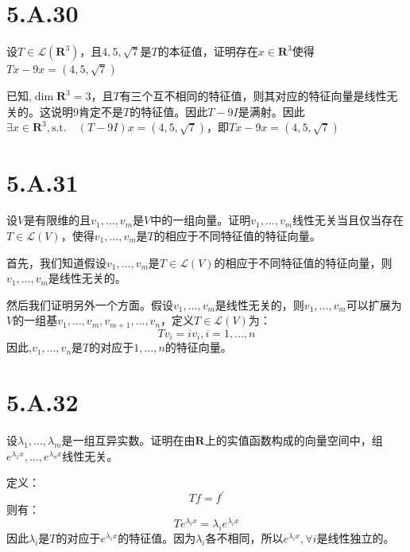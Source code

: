 \documentclass[10pt,a4paper,UTF8]{article}
\begin{document}
\section{5.A.30}
\label{sec:org901b0ee}


\begin{problem}
设\(T\in \mathcal{L}(\mathbf{R}^{3})\)，且\(4,5,\sqrt{7}\)是\(T\)的本征值，证明存在\(x\in \mathbf{R}^{3}\)使得\(Tx - 9x = (4,5,\sqrt{7})\)
\end{problem}

\begin{answer}
已知,\(\dim \mathbf{R}^{3} = 3\)，且\(T\)有三个互不相同的特征值，则其对应的特征向量是线性无关的。这说明\(9\)肯定不是\(T\)的特征值。因此\(T-9I\)是满射。因此\(\exists x\in \mathbf{R}^{3}, \mathrm{s.t.}\quad (T-9I)x = (4,5,\sqrt{7})\)，即\(Tx - 9x = (4,5,\sqrt{7})\)
\end{answer}
\section{5.A.31}
\label{sec:org85840fb}


\begin{problem}
设\(V\)是有限维的且\(v_{1},\ldots ,v_{m}\)是\(V\)中的一组向量。证明\(v_{1},\ldots ,v_{m}\)线性无关当且仅当存在\(T\in \mathcal{L}(V)\)，使得\(v_{1},\ldots ,v_{m}\)是\(T\)的相应于不同特征值的特征向量。
\end{problem}

\begin{answer}
首先，我们知道假设\(v_{1},\ldots ,v_{m}\)是\(T\in \mathcal{L}(V)\)的相应于不同特征值的特征向量，则\(v_{1},\ldots ,v_{m}\)是线性无关的。

然后我们证明另外一个方面。假设\(v_{1},\ldots ,v_{m}\)是线性无关的，则\(v_{1},\ldots ,v_{m}\)可以扩展为\(V\)的一组基\(v_{1},\ldots ,v_{m},v_{m+1},\ldots ,v_{n}\)，定义\(T\in \mathcal{L}(V)\)为：
\begin{equation}
\label{eq:28}
Tv_{i} = iv_{i},i = 1,\ldots ,n
\end{equation}
因此,\(v_{1},\ldots ,v_{n}\)是\(T\)的对应于\(1,\ldots ,n\)的特征向量。
\end{answer}
\section{5.A.32}
\label{sec:orge27a986}


\begin{problem}
设\(\lambda_{1},\ldots ,\lambda_{m}\)是一组互异实数。证明在由\(\mathbf{R}\)上的实值函数构成的向量空间中，组\(e^{\lambda_{1}x},\ldots ,e^{\lambda_{n}x}\)线性无关。
\end{problem}

\begin{answer}
定义：\[Tf = f^{'}\]则有：
\[Te^{\lambda_{i}x} = \lambda_{i}e^{\lambda_{i}x}\] 因此\(\lambda_{i}\)是\(T\)的对应于\(e^{\lambda_{i}x}\)的特征值。因为\(\lambda_{i}\)各不相同，所以\(e^{\lambda_{i}x},\forall i\)是线性独立的。
\end{answer}
\end{document}
